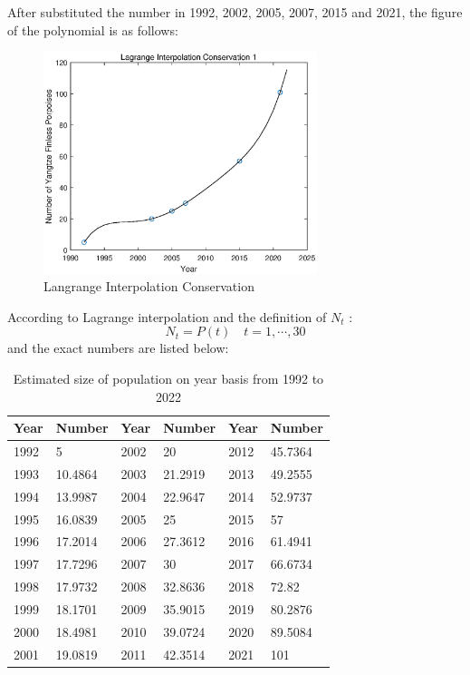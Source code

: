 \documentclass{mcmthesis}
\numberwithin{figure}{section}
\numberwithin{table}{section}
\numberwithin{equation}{section}
\begin{document}
After substituted the number in 1992, 2002, 2005, 2007, 2015 and 2021,
the figure of the polynomial is as follows:
\begin{figure}[htbp!]
  \centering
  \includegraphics[width = 8cm]{codes/Lagrange.eps}
  \caption{Langrange Interpolation Conservation}
\end{figure}

\par
According to Lagrange interpolation and the definition of $ N_t $ :
$$
  N_t = P(t) \quad t = 1,\cdots ,30
$$ 
and the exact numbers are listed below:
\begin{table}[htpb!]
  \centering
  \caption{Estimated size of population on year basis from 1992 to 2022} \label{Lagrange table}
  \begin{tabular}{m{2cm}<{\centering}|m{2cm}<{\centering}|m{2cm}<{\centering}|m{2cm}<{\centering}|m{2cm}<{\centering}|m{2cm}<{\centering}}
  \rowcolor{lightBlue}  \textbf{Year}&\textbf{Number}&\textbf{Year}&\textbf{Number}&\textbf{Year}&\textbf{Number}\\ \hline
  \rowcolor{White}  1992 & 5       & 2002 & 20      & 2012 & 45.7364 \\
  \rowcolor{lightBlue}  1993 & 10.4864 & 2003 & 21.2919 & 2013 & 49.2555 \\
  \rowcolor{White}  1994 & 13.9987 & 2004 & 22.9647 & 2014 & 52.9737 \\
  \rowcolor{lightBlue}  1995 & 16.0839 & 2005 & 25      & 2015 & 57      \\
  \rowcolor{White}  1996 & 17.2014 & 2006 & 27.3612 & 2016 & 61.4941 \\
  \rowcolor{lightBlue}  1997 & 17.7296 & 2007 & 30      & 2017 & 66.6734 \\
  \rowcolor{White}  1998 & 17.9732 & 2008 & 32.8636 & 2018 & 72.82   \\
  \rowcolor{lightBlue}  1999 & 18.1701 & 2009 & 35.9015 & 2019 & 80.2876 \\
  \rowcolor{White}  2000 & 18.4981 & 2010 & 39.0724 & 2020 & 89.5084 \\
  \rowcolor{lightBlue}  2001 & 19.0819 & 2011 & 42.3514 & 2021 & 101     \\
  \end{tabular}
\end{table}
\newpage
\end{document}
